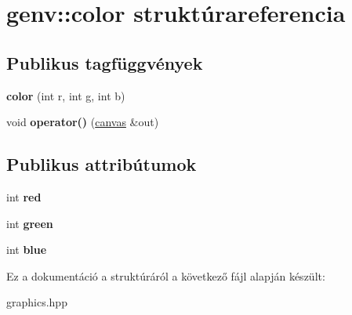 \hypertarget{structgenv_1_1color}{}\section{genv\+:\+:color struktúrareferencia}
\label{structgenv_1_1color}
\subsection*{Publikus tagfüggvények}
\begin{DoxyCompactItemize}
\item 
\mbox{\label{structgenv_1_1color_a212f9aeefe4fd3fd95dfca0cbfc286cd}} 
{\bfseries color} (int r, int g, int b)
\item 
\mbox{\label{structgenv_1_1color_a88efd3188c6cffa85ba3422e7e32c0d9}} 
void {\bfseries operator()} (\hyperlink{classgenv_1_1canvas}{canvas} \&out)
\end{DoxyCompactItemize}
\subsection*{Publikus attribútumok}
\begin{DoxyCompactItemize}
\item 
\mbox{\label{structgenv_1_1color_a0b861888917127b3c11c09130a8b02c3}} 
int {\bfseries red}
\item 
\mbox{\label{structgenv_1_1color_ab7ba9f8dcf43ea8f3e0b644044d3dc52}} 
int {\bfseries green}
\item 
\mbox{\label{structgenv_1_1color_a02a4b955c8dec0e12ac18d9359cef52e}} 
int {\bfseries blue}
\end{DoxyCompactItemize}


Ez a dokumentáció a struktúráról a következő fájl alapján készült\+:\begin{DoxyCompactItemize}
\item 
graphics.\+hpp\end{DoxyCompactItemize}

